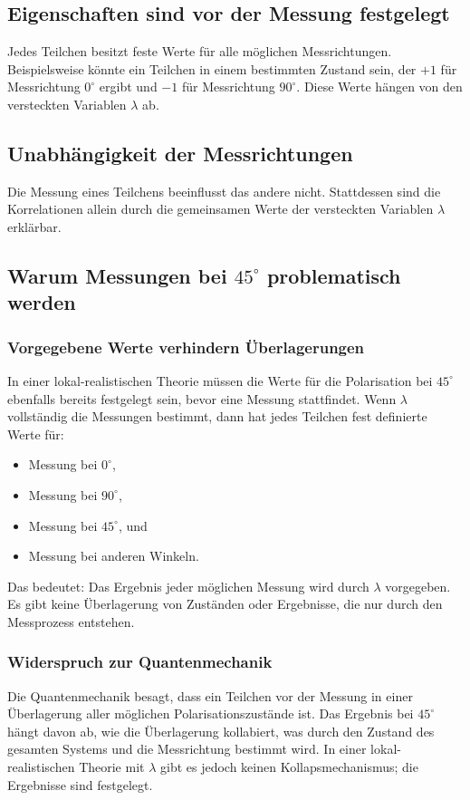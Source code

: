 \documentclass[12pt,a4paper]{article}
\begin{document}
	\subsection{Eigenschaften sind vor der Messung festgelegt}
	Jedes Teilchen besitzt feste Werte für alle möglichen Messrichtungen. Beispielsweise könnte ein Teilchen in einem bestimmten Zustand sein, der $+1$ für Messrichtung $0^\circ$ ergibt und $-1$ für Messrichtung $90^\circ$. Diese Werte hängen von den versteckten Variablen $\lambda$ ab.
	
	\subsection{Unabhängigkeit der Messrichtungen}
	Die Messung eines Teilchens beeinflusst das andere nicht. Stattdessen sind die Korrelationen allein durch die gemeinsamen Werte der versteckten Variablen $\lambda$ erklärbar.
	
	\subsection{Warum Messungen bei $45^\circ$ problematisch werden}
	\subsubsection{Vorgegebene Werte verhindern Überlagerungen}
	In einer lokal-realistischen Theorie müssen die Werte für die Polarisation bei $45^\circ$ ebenfalls bereits festgelegt sein, bevor eine Messung stattfindet. Wenn $\lambda$ vollständig die Messungen bestimmt, dann hat jedes Teilchen fest definierte Werte für:
	\begin{itemize}
		\item Messung bei $0^\circ$,
		\item Messung bei $90^\circ$,
		\item Messung bei $45^\circ$, und
		\item Messung bei anderen Winkeln.
	\end{itemize}
	Das bedeutet: Das Ergebnis jeder möglichen Messung wird durch $\lambda$ vorgegeben. Es gibt keine Überlagerung von Zuständen oder Ergebnisse, die nur durch den Messprozess entstehen.
	
	\subsubsection{Widerspruch zur Quantenmechanik}
	Die Quantenmechanik besagt, dass ein Teilchen vor der Messung in einer Überlagerung aller möglichen Polarisationszustände ist. Das Ergebnis bei $45^\circ$ hängt davon ab, wie die Überlagerung kollabiert, was durch den Zustand des gesamten Systems und die Messrichtung bestimmt wird. In einer lokal-realistischen Theorie mit $\lambda$ gibt es jedoch keinen Kollapsmechanismus; die Ergebnisse sind festgelegt.
	
\end{document}
